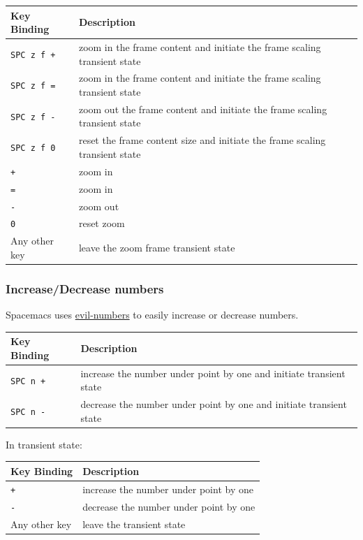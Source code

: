 \documentclass[11pt]{article}
\begin{document}
\begin{enumerate}
\begin{center}
\begin{tabular}{ll}
Key Binding & Description\\
\hline
\texttt{SPC z f +} & zoom in the frame content and initiate the frame scaling transient state\\
\texttt{SPC z f =} & zoom in the frame content and initiate the frame scaling transient state\\
\texttt{SPC z f -} & zoom out the frame content and initiate the frame scaling transient state\\
\texttt{SPC z f 0} & reset the frame content size and initiate the frame scaling transient state\\
\texttt{+} & zoom in\\
\texttt{=} & zoom in\\
\texttt{-} & zoom out\\
\texttt{0} & reset zoom\\
Any other key & leave the zoom frame transient state\\
\end{tabular}
\end{center}
\end{enumerate}

\subsubsection{Increase/Decrease numbers}
\label{sec:org9ca0e24}
Spacemacs uses \href{https://github.com/cofi/evil-numbers}{evil-numbers} to easily increase or decrease numbers.

\begin{center}
\begin{tabular}{ll}
Key Binding & Description\\
\hline
\texttt{SPC n +} & increase the number under point by one and initiate transient state\\
\texttt{SPC n -} & decrease the number under point by one and initiate transient state\\
\end{tabular}
\end{center}

In transient state:

\begin{center}
\begin{tabular}{ll}
Key Binding & Description\\
\hline
\texttt{+} & increase the number under point by one\\
\texttt{-} & decrease the number under point by one\\
Any other key & leave the transient state\\
\end{tabular}
\end{center}
\end{document}
